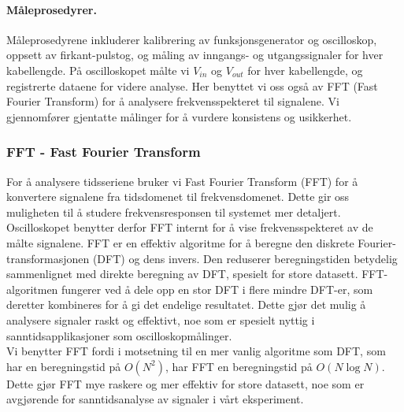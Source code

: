 \paragraph{Måleprosedyrer.}
Måleprosedyrene inkluderer kalibrering av funksjonsgenerator og oscilloskop, oppsett av firkant-pulstog, og måling av inngangs- og utgangssignaler for hver kabellengde. På oscilloskopet målte vi $V_{in}$ og $V_{out}$ for hver kabellengde, og registrerte dataene for videre analyse. Her benyttet vi oss også av FFT (Fast Fourier Transform) for å analysere frekvensspekteret til signalene. Vi gjennomfører gjentatte målinger for å vurdere konsistens og usikkerhet.

\subsubsection{FFT - Fast Fourier Transform}
For å analysere tidsseriene bruker vi Fast Fourier Transform (FFT) for å konvertere signalene fra tidsdomenet til frekvensdomenet. Dette gir oss muligheten til å studere frekvensresponsen til systemet mer detaljert. Oscilloskopet benytter derfor FFT internt for å vise frekvensspekteret av de målte signalene.
FFT er en effektiv algoritme for å beregne den diskrete Fourier-transformasjonen (DFT) og dens invers. Den reduserer beregningstiden betydelig sammenlignet med direkte beregning av DFT, spesielt for store datasett. FFT-algoritmen fungerer ved å dele opp en stor DFT i flere mindre DFT-er, som deretter kombineres for å gi det endelige resultatet. Dette gjør det mulig å analysere signaler raskt og effektivt, noe som er spesielt nyttig i sanntidsapplikasjoner som oscilloskopmålinger. \\ Vi benytter FFT fordi i motsetning til en mer vanlig algoritme som DFT, som har en beregningstid på $O(N^2)$, har FFT en beregningstid på $O(N \log N)$. Dette gjør FFT mye raskere og mer effektiv for store datasett, noe som er avgjørende for sanntidsanalyse av signaler i vårt eksperiment.